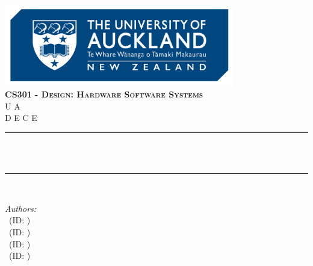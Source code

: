 \begin{titlepage}

\newcommand{\HRule}{\rule{\linewidth}{0.5mm}} %





\begin{center} %


\includegraphics[width = 10cm]{./figures/uoa}\\[1.5cm] 
\textbf{\textsc{\Large CS301 - Design: Hardware Software Systems}}\\[1.0cm] 
{\Large U  A}\\[0.5cm] 
{\large D  E  C E}\\[0.95cm] 


\HRule \\[0.4cm]
{ \Large \bfseries \reporttitle}\\ %
\HRule \\[1.5cm]
\end{center}

\begin{flushleft} \large
\textit{Authors:}\\
\reportauthorOne~(ID: \cidOne)\\ %
\reportauthorTwo~(ID: \cidTwo)\\ %
\reportauthorThree~(ID: \cidThree)\\ %
\reportauthorFour~(ID: \cidFour)   %
\end{flushleft}
\vspace{4cm}
\makeatletter

\vfill %



\makeatother


\end{titlepage}

